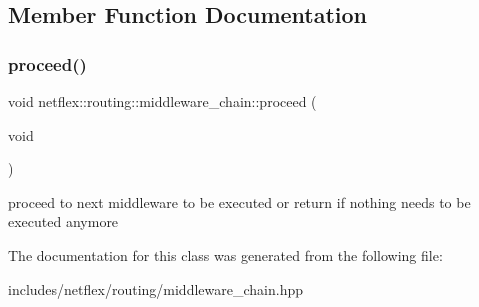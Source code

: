 \subsection{Member Function Documentation}
\mbox{\label{classnetflex_1_1routing_1_1middleware__chain_a762a6cce9e788dd6bb3261336d4bb841}} 
\subsubsection{\texorpdfstring{proceed()}{proceed()}}
{\footnotesize\ttfamily void netflex\+::routing\+::middleware\+\_\+chain\+::proceed (\begin{DoxyParamCaption}\item[{void}]{ }\end{DoxyParamCaption})}

proceed to next middleware to be executed or return if nothing needs to be executed anymore 

The documentation for this class was generated from the following file\+:\begin{DoxyCompactItemize}
\item 
includes/netflex/routing/middleware\+\_\+chain.\+hpp\end{DoxyCompactItemize}
